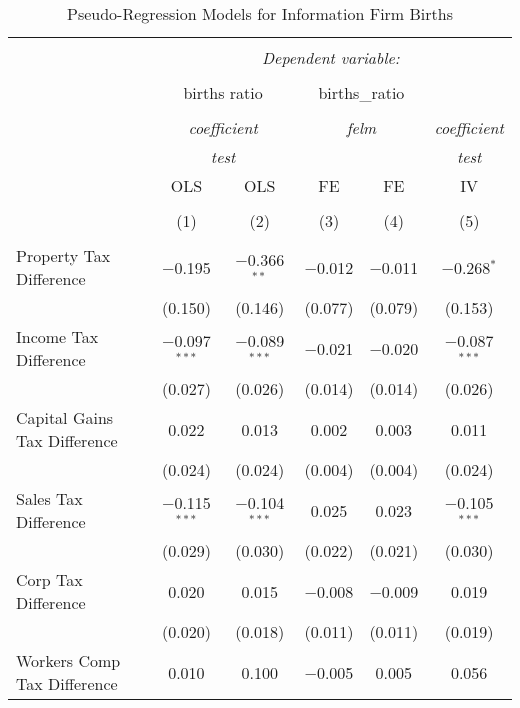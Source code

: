 
\begin{table}[!htbp] \centering 
  \caption{Pseudo-Regression Models for  Information Firm Births} 
  \label{} 
\begin{tabular}{@{\extracolsep{5pt}}lccccc} 
\\[-1.8ex]\hline 
\hline \\[-1.8ex] 
 & \multicolumn{5}{c}{\textit{Dependent variable:}} \\ 
\cline{2-6} 
\\[-1.8ex] & \multicolumn{2}{c}{births ratio} & \multicolumn{2}{c}{births\_ratio} &   \\ 
\\[-1.8ex] & \multicolumn{2}{c}{\textit{coefficient}} & \multicolumn{2}{c}{\textit{felm}} & \textit{coefficient} \\ 
 & \multicolumn{2}{c}{\textit{test}} & \multicolumn{2}{c}{\textit{}} & \textit{test} \\ 
 & OLS & OLS & FE & FE & IV \\ 
\\[-1.8ex] & (1) & (2) & (3) & (4) & (5)\\ 
\hline \\[-1.8ex] 
 Property Tax Difference & $-$0.195 & $-$0.366$^{**}$ & $-$0.012 & $-$0.011 & $-$0.268$^{*}$ \\ 
  & (0.150) & (0.146) & (0.077) & (0.079) & (0.153) \\ 
  Income Tax Difference & $-$0.097$^{***}$ & $-$0.089$^{***}$ & $-$0.021 & $-$0.020 & $-$0.087$^{***}$ \\ 
  & (0.027) & (0.026) & (0.014) & (0.014) & (0.026) \\ 
  Capital Gains Tax Difference & 0.022 & 0.013 & 0.002 & 0.003 & 0.011 \\ 
  & (0.024) & (0.024) & (0.004) & (0.004) & (0.024) \\ 
  Sales Tax Difference & $-$0.115$^{***}$ & $-$0.104$^{***}$ & 0.025 & 0.023 & $-$0.105$^{***}$ \\ 
  & (0.029) & (0.030) & (0.022) & (0.021) & (0.030) \\ 
  Corp Tax Difference & 0.020 & 0.015 & $-$0.008 & $-$0.009 & 0.019 \\ 
  & (0.020) & (0.018) & (0.011) & (0.011) & (0.019) \\ 
  Workers Comp Tax Difference & 0.010 & 0.100 & $-$0.005 & 0.005 & 0.056 \\ 

\end{tabular}
\end{table}

